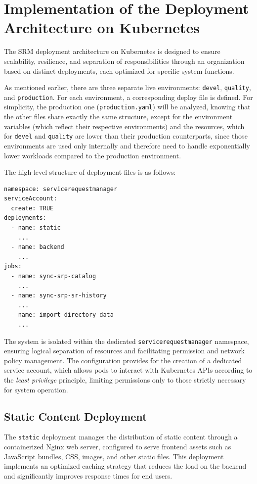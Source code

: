 \section{Implementation of the Deployment Architecture on Kubernetes}
The SRM deployment architecture on Kubernetes is designed to ensure scalability, resilience, and separation of responsibilities through an organization based on distinct deployments, each optimized for specific system functions.

As mentioned earlier, there are three separate live environments: \texttt{devel}, \texttt{quality}, and \texttt{production}. For each environment, a corresponding deploy file is defined. For simplicity, the production one (\texttt{production.yaml}) will be analyzed, knowing that the other files share exactly the same structure, except for the environment variables (which reflect their respective environments) and the resources, which for \texttt{devel} and \texttt{quality} are lower than their production counterparts, since those environments are used only internally and therefore need to handle exponentially lower workloads compared to the production environment.

The high-level structure of deployment files is as follows:

\begin{verbatim}
namespace: servicerequestmanager
serviceAccount:
  create: TRUE
deployments:
  - name: static
    ...
  - name: backend
    ...
jobs:
  - name: sync-srp-catalog
    ...
  - name: sync-srp-sr-history
    ...
  - name: import-directory-data
    ...
\end{verbatim}

The system is isolated within the dedicated \texttt{servicerequestmanager} namespace, ensuring logical separation of resources and facilitating permission and network policy management. The configuration provides for the creation of a dedicated service account, which allows pods to interact with Kubernetes APIs according to the \textit{least privilege} principle, limiting permissions only to those strictly necessary for system operation.

\subsection{Static Content Deployment}
The \texttt{static} deployment manages the distribution of static content through a containerized Nginx web server, configured to serve frontend assets such as JavaScript bundles, CSS, images, and other static files. This deployment implements an optimized caching strategy that reduces the load on the backend and significantly improves response times for end users.

